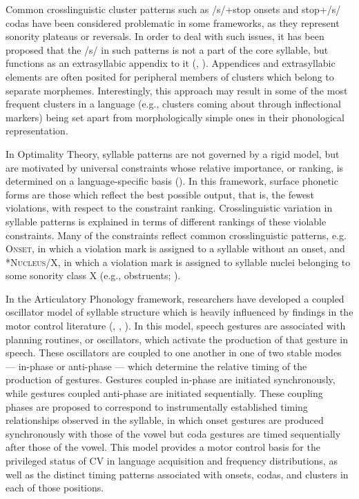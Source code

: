   Common crosslinguistic cluster patterns such as /s/+stop onsets and stop+/s/ codas have been considered problematic in some frameworks, as they represent sonority plateaus or reversals. In order to deal with such issues, it has been proposed that the /s/ in such patterns is not a part of the core syllable, but functions as an extrasyllabic appendix to it (\citealt{VauxWolfe2009}, \citealt{Duanmu2011}). Appendices and extrasyllabic elements are often posited for peripheral members of clusters which belong to separate morphemes. Interestingly, this approach may result in some of the most frequent clusters in a language (e.g., clusters coming about through inflectional markers) being set apart from morphologically simple ones in their phonological representation.

  In Optimality Theory, syllable patterns are not governed by a rigid model, but are motivated by universal constraints whose relative importance, or ranking, is determined on a language-specific basis (\citealt{PrinceSmolensky1993}). In this framework, surface phonetic forms are those which reflect the best possible output, that is, the fewest violations, with respect to the constraint ranking. Crosslinguistic variation in syllable patterns is explained in terms of different rankings of these violable constraints. Many of the constraints reflect common crosslinguistic patterns, e.g. \textsc{Onset}, in which a violation mark is assigned to a syllable without an onset, and *\textsc{Nucleus}/X, in which a violation mark is assigned to syllable nuclei belonging to some sonority class X (e.g., obstruents; \citealt{McCarthy2008}).

  In the Articulatory Phonology framework, researchers have developed a coupled oscillator model of syllable structure which is heavily influenced by findings in the motor control literature (\citealt{NamSaltzman2003}, \citealt{GoldsteinEtAl2006}, \citealt{NamEtAl2009}). In this model, speech gestures are associated with planning routines, or oscillators, which activate the production of that gesture in speech. These oscillators are coupled to one another in one of two stable modes — in-phase or anti-phase — which determine the relative timing of the production of gestures. Gestures coupled in-phase are initiated synchronously, while gestures coupled anti-phase are initiated sequentially. These coupling phases are proposed to correspond to instrumentally established timing relationships observed in the syllable, in which onset gestures are produced synchronously with those of the vowel but coda gestures are timed sequentially after those of the vowel. This model provides a motor control basis for the privileged status of CV in language acquisition and frequency distributions, as well as the distinct timing patterns associated with onsets, codas, and clusters in each of those positions.

